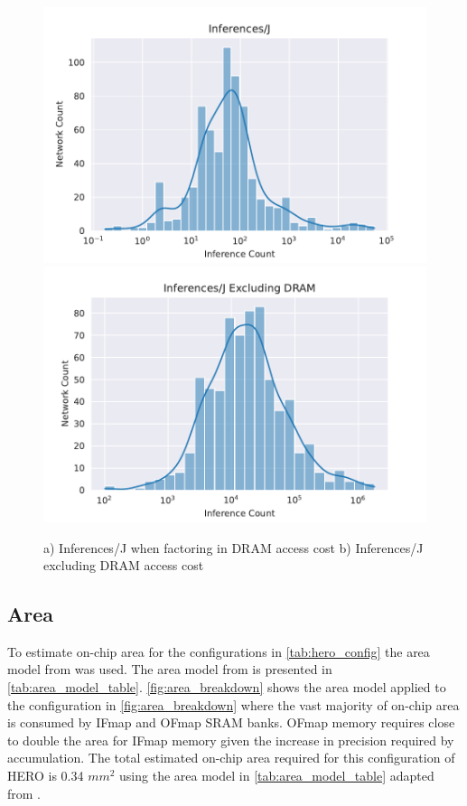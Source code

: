 \begin{figure}
    \centering
    \includegraphics[scale=0.48]{Plots/energy/inferences.pdf}
    \hspace{0.1cm} 
    \includegraphics[scale=0.48]{Plots/energy/inferences_wo_dram.pdf}
    \caption{a) Inferences/J when factoring in DRAM access cost b) Inferences/J excluding DRAM access cost}
    \label{fig:inferences_per_j}
\end{figure}

\subsection{Area}
\label{chap:hero:results:area}

To estimate on-chip area for the configurations in
\autoref{tab:hero_config} the area model from \cite{area_model} was used. The area
model from \cite{area_model} is presented in \autoref{tab:area_model_table}.
\autoref{fig:area_breakdown} shows the area model applied to the configuration
in \autoref{fig:area_breakdown} where the vast majority of on-chip area is
consumed by IFmap and OFmap SRAM banks. OFmap memory requires close to double
the area for IFmap memory given the increase in precision required by
accumulation. The total estimated on-chip area required for this configuration
of HERO is 0.34 $mm^2$ using the area model in \autoref{tab:area_model_table}
adapted from \cite{area_model}.

